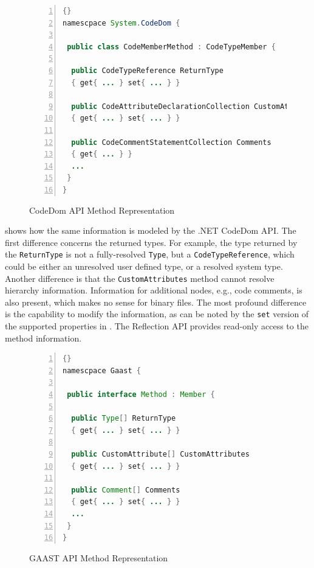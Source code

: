 \begin{figure}[ht]
	\centering
	\begin{minipage}[b]{8.5cm}
	\begin{center}	
\begin{scriptsize}
		\begin{lstlisting}[numbers=left,language=Java,frame=leftline]{}
namescpace System.CodeDom {

 public class CodeMemberMethod : CodeTypeMember {

  public CodeTypeReference ReturnType
  { get{ ... } set{ ... } }
		
  public CodeAttributeDeclarationCollection CustomAttributes
  { get{ ... } set{ ... } }

  public CodeCommentStatementCollection Comments
  { get{ ... } }
  ...
 }
}
		\end{lstlisting}
		\end{scriptsize}
	\end{center}
	\caption{CodeDom API Method Representation}
	\label{c3:netdom}
\end{minipage}	
\end{figure}

 shows how the same information is modeled by the .NET Code\-Dom API. The first difference concerns the returned types. For example, the type returned by the \texttt{Re\-turn\-Ty\-pe} is not a fully-resolved \texttt{Ty\-pe}, but a \texttt{Co\-de\-Type\-Re\-fe\-rence}, which could be either an unresolved user defined type, or a resolved system type. Another difference is that the \texttt{Cu\-stom\-Attri\-butes} method cannot resolve hierarchy information. Information for additional nodes, e.g., code comments, is also present, which makes no sense for binary files. The most profound difference is the capability to modify the information, as can be noted by the \texttt{set} version of the supported properties in . The Reflection API provides read-only access to the method information.

\begin{figure}[ht]
	\centering
	\begin{minipage}[b]{8.5cm}
	\begin{center}	
\begin{scriptsize}
		\begin{lstlisting}[numbers=left,language=Java,frame=leftline]{}
namescpace Gaast {
	
 public interface Method : Member {

  public Type[] ReturnType
  { get{ ... } set{ ... } }
		
  public CustomAttribute[] CustomAttributes
  { get{ ... } set{ ... } }

  public Comment[] Comments
  { get{ ... } set{ ... } }
  ...
 }
}
		\end{lstlisting}
		\end{scriptsize}
	\end{center}
	\caption{GAAST API Method Representation}
	\label{c3:netgaast}
\end{minipage}	
\end{figure}

